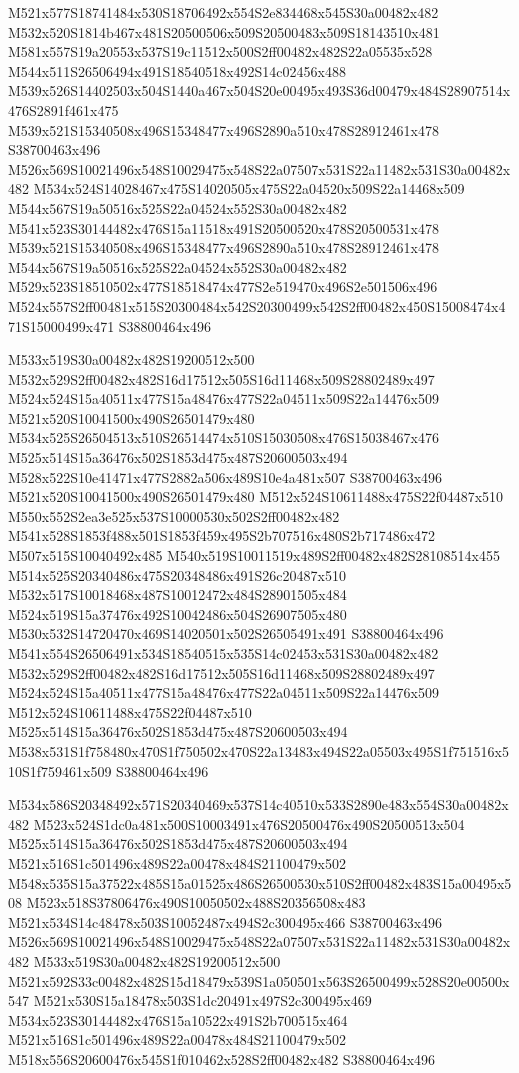 \documentclass{article}
\begin{document}
\begin{multicols}{2}
M521x577S18741484x530S18706492x554S2e834468x545S30a00482x482 M532x520S1814b467x481S20500506x509S20500483x509S18143510x481 M581x557S19a20553x537S19c11512x500S2ff00482x482S22a05535x528 M544x511S26506494x491S18540518x492S14c02456x488 M539x526S14402503x504S1440a467x504S20e00495x493S36d00479x484S28907514x476S2891f461x475 M539x521S15340508x496S15348477x496S2890a510x478S28912461x478 S38700463x496 M526x569S10021496x548S10029475x548S22a07507x531S22a11482x531S30a00482x482 M534x524S14028467x475S14020505x475S22a04520x509S22a14468x509 M544x567S19a50516x525S22a04524x552S30a00482x482 M541x523S30144482x476S15a11518x491S20500520x478S20500531x478 M539x521S15340508x496S15348477x496S2890a510x478S28912461x478 M544x567S19a50516x525S22a04524x552S30a00482x482 M529x523S18510502x477S18518474x477S2e519470x496S2e501506x496 M524x557S2ff00481x515S20300484x542S20300499x542S2ff00482x450S15008474x471S15000499x471 S38800464x496

M533x519S30a00482x482S19200512x500 M532x529S2ff00482x482S16d17512x505S16d11468x509S28802489x497 M524x524S15a40511x477S15a48476x477S22a04511x509S22a14476x509 M521x520S10041500x490S26501479x480 M534x525S26504513x510S26514474x510S15030508x476S15038467x476 M525x514S15a36476x502S1853d475x487S20600503x494 M528x522S10e41471x477S2882a506x489S10e4a481x507 S38700463x496 M521x520S10041500x490S26501479x480 M512x524S10611488x475S22f04487x510 M550x552S2ea3e525x537S10000530x502S2ff00482x482 M541x528S1853f488x501S1853f459x495S2b707516x480S2b717486x472 M507x515S10040492x485 M540x519S10011519x489S2ff00482x482S28108514x455 M514x525S20340486x475S20348486x491S26c20487x510 M532x517S10018468x487S10012472x484S28901505x484 M524x519S15a37476x492S10042486x504S26907505x480 M530x532S14720470x469S14020501x502S26505491x491 S38800464x496 M541x554S26506491x534S18540515x535S14c02453x531S30a00482x482 M532x529S2ff00482x482S16d17512x505S16d11468x509S28802489x497 M524x524S15a40511x477S15a48476x477S22a04511x509S22a14476x509 M512x524S10611488x475S22f04487x510 M525x514S15a36476x502S1853d475x487S20600503x494 M538x531S1f758480x470S1f750502x470S22a13483x494S22a05503x495S1f751516x510S1f759461x509 S38800464x496

M534x586S20348492x571S20340469x537S14c40510x533S2890e483x554S30a00482x482 M523x524S1dc0a481x500S10003491x476S20500476x490S20500513x504 M525x514S15a36476x502S1853d475x487S20600503x494 M521x516S1c501496x489S22a00478x484S21100479x502 M548x535S15a37522x485S15a01525x486S26500530x510S2ff00482x483S15a00495x508 M523x518S37806476x490S10050502x488S20356508x483 M521x534S14c48478x503S10052487x494S2c300495x466 S38700463x496 M526x569S10021496x548S10029475x548S22a07507x531S22a11482x531S30a00482x482 M533x519S30a00482x482S19200512x500 M521x592S33c00482x482S15d18479x539S1a050501x563S26500499x528S20e00500x547 M521x530S15a18478x503S1dc20491x497S2c300495x469 M534x523S30144482x476S15a10522x491S2b700515x464 M521x516S1c501496x489S22a00478x484S21100479x502 M518x556S20600476x545S1f010462x528S2ff00482x482 S38800464x496


\end{multicols}
\end{document}
